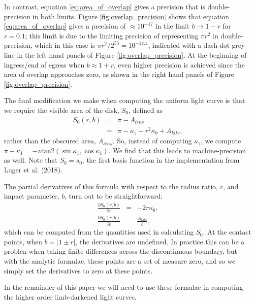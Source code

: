 \documentclass[modern]{aastex61}
\begin{document}
In contrast, equation \ref{eq:area_of_overlap} gives a precision
that is double-precision in both limits.  Figure
\ref{fig:overlap_precision} shows that equation \ref{eq:area_of_overlap} 
gives a precision of $\approx 10^{-17}$ in the limit $b \rightarrow
1-r$ for $r=0.1$; this limit is due to the limiting precision of
representing $\pi r^2$ in double-precision, which in this case
is $\pi r^2 / 2^{53} = 10^{-17.4}$, indicated with a dash-dot
grey line in the left hand panels of Figure \ref{fig:overlap_precision}.
At the beginning of ingress/end of egress when $b \approx 1+r$, 
even higher precision is achieved since the area of overlap approaches
zero, as shown in the right hand panels of Figure \ref{fig:overlap_precision}.

The final modification we make when computing the uniform light
curve is that we require the visible area of the disk, $S_0$, defined as
\begin{eqnarray} \label{eq:uniform}
S_0(r,b) &=& \pi-A_{lens}\\
&=&\pi -\kappa_1 - r^2\kappa_0 + A_{kite},
\end{eqnarray}
rather than the obscured area, $A_{lens}$.  So, instead of computing $\kappa_1$,
we compute $\pi-\kappa_1 = -\mathrm{atan2}(\sin{\kappa_1},\cos{\kappa_1})$.
We find that this leads to machine-precision as well.  Note that $S_0=s_0$,
the first basis function in the \starry implementation from Luger et al. (2018).

The partial derivatives of this formula with respect to the radius
ratio, $r$, and impact parameter, $b$, turn out to be straightforward:
\begin{eqnarray}
\frac{\partial S_0(r,b)}{\partial r} &=& -2r \kappa_0,\\
\frac{\partial S_0(r,b)}{\partial b} &=& \frac{A_{kite}}{b},
\end{eqnarray}
which can be computed from the quantities used in calculating $S_0$.
At the contact points, when $b = \vert 1\pm r\vert$, the derivatives are undefined.
In practice this can be a problen when taking finite-differences across
the discontinuous boundary, but with the analytic formulae, these points
are a set of measure zero, and so we simply set the derivatives to zero
at these points.

In the remainder of this paper we will need to use these formulae in computing
the higher order limb-darkened light curves.
\end{document}
